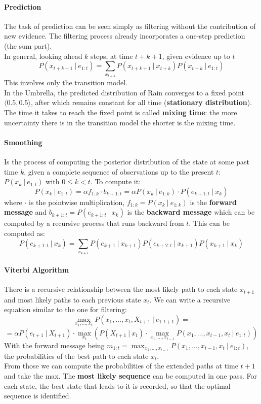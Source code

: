\documentclass[10pt]{report}
\begin{document}
\paragraph{Prediction} The task of prediction can be seen simply as filtering without the contribution of new evidence. The filtering process already incorporates a one-step prediction (the sum part).\\
In general, looking ahead $k$ steps, at time $t+k+1$, given evidence up to $t$ $$P(x_{t+k+1}\:|\:e_{1:t})=\sum_{x_{t+k}} P(x_{t+k+1}\:|\:x_{t+k})P(x_{t+k}\:|\:e_{1:t})$$
This involves only the transition model.\\
In the Umbrella, the predicted distribution of Rain converges to a fixed point $\langle 0.5,0.5\rangle$, after which remains constant for all time (\textbf{stationary distribution}). The time it takes to reach the fixed point is called \textbf{mixing time}: the more uncertainty there is in the transition model the shorter is the mixing time.
\paragraph{Smoothing} Is the process of computing the posterior distribution of the state at some past time $k$, given a complete sequence of observations up to the present $t$: $P(x_k\:|\:e_{1:t})$ with $0\leq k< t$. To compute it:
$$P(x_k\:|\:e_{1:t}) = \alpha f_{1:k}\cdot b_{k+1:t} = \alpha  P(x_k\:|\:e_{1:k}) \cdot P(e_{k+1:t}\:|\:x_k)$$ where $\cdot$ is the pointwise multiplication, $f_{1:k} = P(x_k\:|\:e_{1:k})$ is the \textbf{forward message} and $b_{k+1:t} = P(e_{k+1:t}\:|\:x_k)$ is the \textbf{backward message} which can be computed by a recursive process that runs backward from $t$. This can be computed as: $$P(e_{k+1:t}\:|\:x_k) = \sum_{x_{k+1}} P(e_{k+1}\:|\:x_{k+1})P(e_{k+2:t}\:|\:x_{k+1})P(x_{k+1}\:|\:x_k)$$
\paragraph{Viterbi Algorithm}
There is a recursive relationship between the most likely path to each state $x_{t+1}$ and most likely paths to each previous state $x_t$. We can write a recursive equation similar to the one for filtering:\\$$\max_{x_1,\ldots,x_t} P(x_1,\ldots,x_t,X_{t+1}\:|\:e_{1:t+1}) =$$ $$=\alpha P(e_{t+1}\:|\:X_{t+1})\cdot\max_{x_t}\left(P(X_{t+1}\:|\:x_t)\cdot \max_{x_1,\ldots,x_{t-1}}P(x_1,\ldots,x_{t-1},x_t\:|\:e_{1:t})\right)$$
With the forward message being $m_{1:t} = \max_{x_1,\ldots,x_{t-1}} P(x_1,\ldots,x_{t-1},x_t\:|\:e_{1:t})$, the probabilities of the best path to each state $x_t$.\\From those we can compute the probabilities of the extended paths at time $t+1$ and take the max. The \textbf{most likely sequence} can be computed in one pass. For each state, the best state that leads to it is recorded, so that the optimal sequence is identified.
\end{document}
